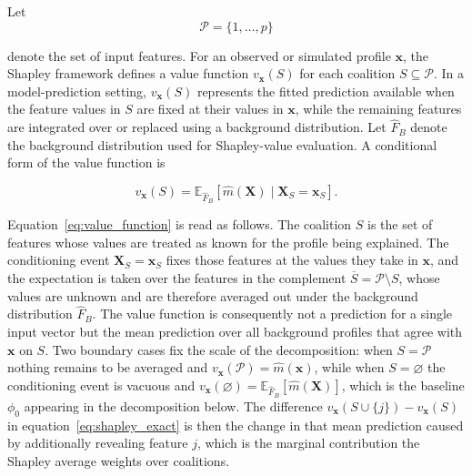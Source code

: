 \noindent
Let
\begin{equation}
  \label{eq:feature_set}
      \mathcal{P}=\{1,\ldots,p\}
  \end{equation}
  
denote the set of input features. For an observed or simulated profile
\(\mathbf{x}\), the Shapley framework defines a value function
\(v_{\mathbf{x}}(S)\) for each coalition \(S\subseteq\mathcal{P}\). In a
model-prediction setting, \(v_{\mathbf{x}}(S)\) represents the fitted prediction available when the feature values in \(S\) are fixed at their values in \(\mathbf{x}\), while the remaining features are integrated over or replaced using a background distribution. Let \(\widehat{F}_{B}\) denote the background distribution used for Shapley-value evaluation. A conditional form of the value function is

\begin{equation}
  \label{eq:value_function}
      v_{\mathbf{x}}(S)
      =
      \mathbb{E}_{\widehat{F}_{B}}
      \!\left[
          \widehat{m}(\mathbf{X})
          \mid
          \mathbf{X}_{S}=\mathbf{x}_{S}
      \right].
\end{equation}

Equation~\eqref{eq:value_function} is read as follows. The coalition \(S\)
is the set of features whose values are treated as known for the profile
being explained. The conditioning event \(\mathbf{X}_{S}=\mathbf{x}_{S}\)
fixes those features at the values they take in \(\mathbf{x}\), and the
expectation is taken over the features in the complement
\(\overline{S}=\mathcal{P}\setminus S\), whose values are unknown and are
therefore averaged out under the background distribution
\(\widehat{F}_{B}\). The value function is consequently not a prediction
for a single input vector but the mean prediction over all background
profiles that agree with \(\mathbf{x}\) on \(S\). Two boundary cases fix
the scale of the decomposition: when \(S=\mathcal{P}\) nothing remains to
be averaged and
\(v_{\mathbf{x}}(\mathcal{P})=\widehat{m}(\mathbf{x})\), while when
\(S=\varnothing\) the conditioning event is vacuous and
\(v_{\mathbf{x}}(\varnothing)=\mathbb{E}_{\widehat{F}_{B}}[\widehat{m}(\mathbf{X})]\),
which is the baseline \(\phi_{0}\) appearing in the decomposition below.
The difference
\(v_{\mathbf{x}}(S\cup\{j\})-v_{\mathbf{x}}(S)\) in
equation~\eqref{eq:shapley_exact} is then the change in that mean
prediction caused by additionally revealing feature \(j\), which is the
marginal contribution the Shapley average weights over coalitions.

